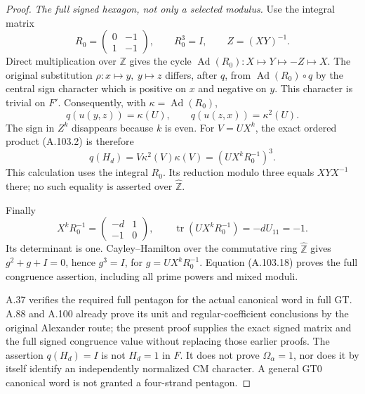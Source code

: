 \begin{proof}
\emph{The full signed hexagon, not only a selected modulus.}
Use the integral matrix
\[
 R_0=\begin{pmatrix}0&-1\\1&-1\end{pmatrix},\qquad
 R_0^3=I,\qquad Z=(XY)^{-1}.
 \tag{A.103.16}
\]
Direct multiplication over \(\mathbb Z\) gives the cycle
\(\operatorname{Ad}(R_0):X\mapsto Y\mapsto -Z\mapsto X\).
The original substitution
\(\rho:x\mapsto y,\ y\mapsto z\) differs, after \(q\), from
\(\operatorname{Ad}(R_0)\circ q\) by the central sign character
which is positive on \(x\) and negative on \(y\).
This character is trivial on \(F'\). Consequently, with
\(\kappa=\operatorname{Ad}(R_0)\),
\[
 q(u(y,z))=\kappa(U),\qquad
 q(u(z,x))=\kappa^2(U).
 \tag{A.103.17}
\]
The sign in \(Z^k\) disappears because \(k\) is even.
For \(V=UX^k\), the exact ordered product (A.103.2) is therefore
\[
 q(H_d)=V\kappa^2(V)\kappa(V)=(UX^kR_0^{-1})^3.
 \tag{A.103.18}
\]
This calculation uses the integral \(R_0\).
Its reduction modulo three equals \(XYX^{-1}\) there; no such
equality is asserted over \(\widehat{\mathbb Z}\).

Finally
\[
 X^kR_0^{-1}=\begin{pmatrix}-d&1\\-1&0\end{pmatrix},
 \qquad
 \operatorname{tr}(UX^kR_0^{-1})=-dU_{11}=-1.
 \tag{A.103.19}
\]
Its determinant is one. Cayley--Hamilton over the commutative ring
\(\widehat{\mathbb Z}\) gives \(g^2+g+I=0\), hence \(g^3=I\),
for \(g=UX^kR_0^{-1}\). Equation (A.103.18) proves the full
congruence assertion, including all prime powers and mixed moduli.

A.37 verifies the required full pentagon for the actual canonical
word in full GT. A.88 and A.100 already prove its unit and
regular-coefficient conclusions by the original Alexander route;
the present proof supplies the exact signed matrix and the full
signed congruence value without replacing those earlier proofs.
The assertion \(q(H_d)=I\) is not \(H_d=1\) in \(F\).
It does not prove \(\Omega_\alpha=1\), nor does it by itself
identify an independently normalized CM character.
A general GT0 canonical word is not granted a four-strand pentagon.
\end{proof}

